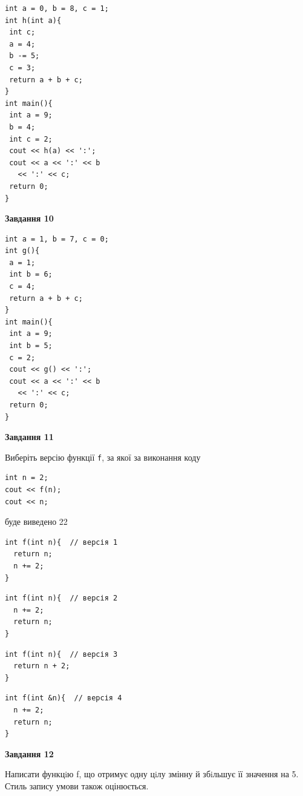 \documentclass[12pt, ukrainian]{article}
\def\code#1{\Verb!#1!}
\begin{document}
{\begin {large}
\begin{minipage}[t]{7.0cm}
\begin{verbatim}
int a = 0, b = 8, c = 1;
int h(int a){
 int c;
 a = 4;
 b -= 5;
 c = 3;
 return a + b + c;
}
int main(){
 int a = 9;
 b = 4;
 int c = 2;
 cout << h(a) << ':';
 cout << a << ':' << b 
   << ':' << c;
 return 0;
}
\end{verbatim}



\begin{center}
\textbf{Завдання 10}
\end{center}
\vspace{-8mm}

\begin{verbatim}
int a = 1, b = 7, c = 0;
int g(){
 a = 1;
 int b = 6;
 c = 4;
 return a + b + c;
}
int main(){
 int a = 9;
 int b = 5;
 c = 2;
 cout << g() << ':';
 cout << a << ':' << b 
   << ':' << c;
 return 0;
}
\end{verbatim}

\end{minipage}
\vline \hspace{1mm}
\begin{minipage}[t]{11.0cm}

\begin{center}
\textbf{Завдання 11}
\end{center}
Виберіть версію функції \code{f}, за якої за виконання коду
\begin{verbatim}
int n = 2;
cout << f(n);
cout << n;
\end{verbatim}

буде виведено 22

\begin{verbatim}
int f(int n){  // версія 1
  return n;
  n += 2;
}
\end{verbatim}

\vspace{-8mm}\begin{verbatim}
int f(int n){  // версія 2
  n += 2;
  return n;
}
\end{verbatim}

\vspace{-8mm}\begin{verbatim}
int f(int n){  // версія 3
  return n + 2;
}
\end{verbatim}

\vspace{-8mm}\begin{verbatim}
int f(int &n){  // версія 4
  n += 2;
  return n;
}
\end{verbatim}



\begin{center}
\textbf{Завдання 12}
\end{center}

Написати функцiю f, що отримує одну цiлу змінну й збiльшує її значення на 5. Стиль запису умови також оцінюється.\par

\end{minipage}

\end {large}}
\newpage
\end{document}

